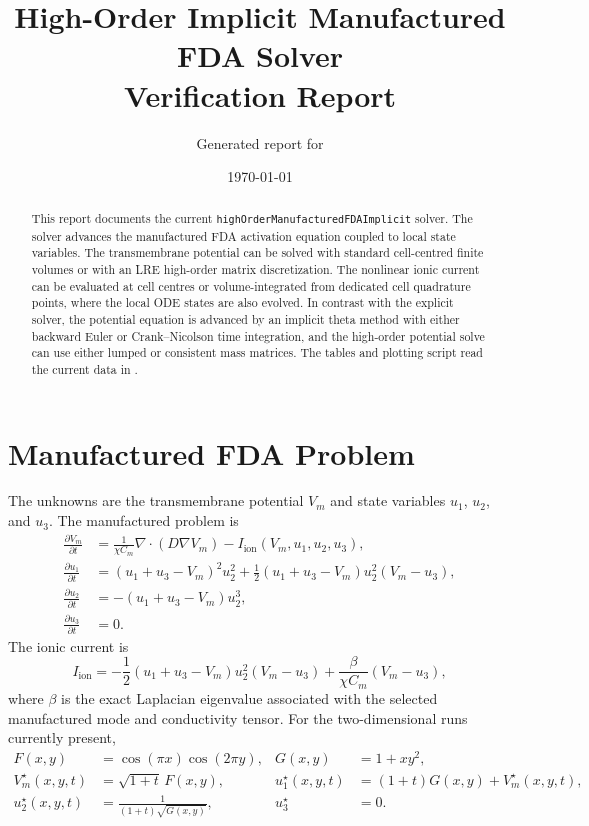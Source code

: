 \documentclass[11pt,a4paper]{article}
\title{High-Order Implicit Manufactured FDA Solver\\Verification Report}
\author{Generated report for \code{highOrderManufacturedFDAImplicit}}
\date{\today}
\newcommand{\code}[1]{\texttt{#1}}
\begin{document}
\maketitle

\begin{abstract}
This report documents the current \code{highOrderManufacturedFDAImplicit} solver. The solver advances the manufactured FDA activation equation coupled to local state variables. The transmembrane potential can be solved with standard cell-centred finite volumes or with an LRE high-order matrix discretization. The nonlinear ionic current can be evaluated at cell centres or volume-integrated from dedicated cell quadrature points, where the local ODE states are also evolved. In contrast with the explicit solver, the potential equation is advanced by an implicit theta method with either backward Euler or Crank--Nicolson time integration, and the high-order potential solve can use either lumped or consistent mass matrices. The tables and plotting script read the current data in .
\end{abstract}

\section{Manufactured FDA Problem}
The unknowns are the transmembrane potential $V_m$ and state variables $u_1$, $u_2$, and $u_3$. The manufactured problem is
\begin{align}
\frac{\partial V_m}{\partial t}
&= \frac{1}{\chi C_m}\nabla\cdot(D\nabla V_m)
- I_{\mathrm{ion}}(V_m,u_1,u_2,u_3),\\
\frac{\partial u_1}{\partial t}
&= (u_1+u_3-V_m)^2u_2^2
+ \frac{1}{2}(u_1+u_3-V_m)u_2^2(V_m-u_3),\\
\frac{\partial u_2}{\partial t}
&= -(u_1+u_3-V_m)u_2^3,\\
\frac{\partial u_3}{\partial t}
&= 0.
\end{align}
The ionic current is
\begin{equation}
I_{\mathrm{ion}}
= -\frac{1}{2}(u_1+u_3-V_m)u_2^2(V_m-u_3)
+ \frac{\beta}{\chi C_m}(V_m-u_3),
\end{equation}
where $\beta$ is the exact Laplacian eigenvalue associated with the selected manufactured mode and conductivity tensor. For the two-dimensional runs currently present,
\begin{align}
F(x,y) &= \cos(\pi x)\cos(2\pi y), & G(x,y) &= 1 + x y^2,\\
V_m^\star(x,y,t) &= \sqrt{1+t}\,F(x,y), &
u_1^\star(x,y,t) &= (1+t)G(x,y) + V_m^\star(x,y,t),\\
u_2^\star(x,y,t) &= \frac{1}{(1+t)\sqrt{G(x,y)}}, &
u_3^\star &= 0.
\end{align}
\end{document}
